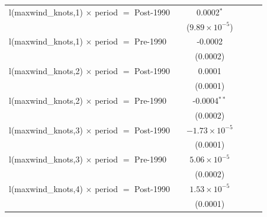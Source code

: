 \begin{tabular}{lccccc}
   l(maxwind\_knots,1) $\times$ period $=$ Post-1990          &                & 0.0002$^{*}$            &                &                         &   \\   
                                                              &                & ($9.89\times 10^{-5}$)  &                &                         &   \\   
   l(maxwind\_knots,1) $\times$ period $=$ Pre-1990           &                & -0.0002                 &                &                         &   \\   
                                                              &                & (0.0002)                &                &                         &   \\   
   l(maxwind\_knots,2) $\times$ period $=$ Post-1990          &                & 0.0001                  &                &                         &   \\   
                                                              &                & (0.0001)                &                &                         &   \\   
   l(maxwind\_knots,2) $\times$ period $=$ Pre-1990           &                & -0.0004$^{**}$          &                &                         &   \\   
                                                              &                & (0.0002)                &                &                         &   \\   
   l(maxwind\_knots,3) $\times$ period $=$ Post-1990          &                & $-1.73\times 10^{-5}$   &                &                         &   \\   
                                                              &                & (0.0001)                &                &                         &   \\   
   l(maxwind\_knots,3) $\times$ period $=$ Pre-1990           &                & $5.06\times 10^{-5}$    &                &                         &   \\   
                                                              &                & (0.0002)                &                &                         &   \\   
   l(maxwind\_knots,4) $\times$ period $=$ Post-1990          &                & $1.53\times 10^{-5}$    &                &                         &   \\   
                                                              &                & (0.0001)                &                &                         &   \\   

\end{tabular}
